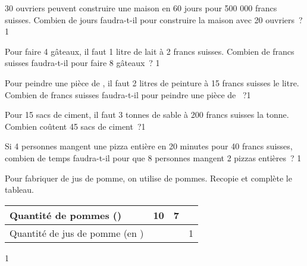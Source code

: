 \documentclass[a4paper,11pt]{report}
\begin{document}
\begin{exo} %
{30 ouvriers peuvent construire une maison en 60 jours pour 500 000 francs suisses. Combien de jours faudra-t-il pour construire la maison avec 20 ouvriers~?}{1}
\end{exo}


\begin{exo} %
{Pour faire 4 gâteaux, il faut 1 litre de lait à 2 francs suisses. Combien de francs suisses faudra-t-il pour faire 8 gâteaux~?
}{1}
\end{exo}




\begin{exo} %
	{Pour peindre une pièce de , il faut 2 litres de peinture à 15 francs suisses le litre. Combien de francs suisses faudra-t-il pour peindre une pièce de ~?}{1}
\end{exo}






\begin{exo} %
{Pour 15 sacs de ciment, il faut 3 tonnes de sable à 200 francs suisses la tonne. Combien coûtent 45 sacs de ciment~?}{1}
\end{exo}

\begin{exo} %
{Si 4 personnes mangent une pizza entière en 20 minutes pour 40 francs suisses, combien de temps faudra-t-il pour que 8 personnes mangent 2 pizzas entières~?
}{1}
\end{exo}



\begin{exo}{
		Pour fabriquer  de jus de pomme, on utilise  de pommes. Recopie et complète le tableau.

		\begin{center}
{\renewcommand{\arraystretch}{1.5}\setlength{\tabcolsep}{.75cm}
\begin{tabular}{|l|c|c|c|}\hline
	Quantité de pommes (\tunit{}{\kg}) & 10 & 7 &  \\\hline
	Quantité de jus de pomme (en \tunit{}{\liter}) & & & 1 \\\hline
\end{tabular}}
\end{center}
\vspace{-0.5cm}
}{1}\end{exo}
\end{document}
